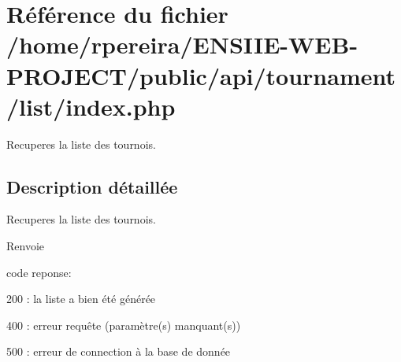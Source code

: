 \hypertarget{tournament_2list_2index_8php}{}\section{Référence du fichier /home/rpereira/\+E\+N\+S\+I\+I\+E-\/\+W\+E\+B-\/\+P\+R\+O\+J\+E\+C\+T/public/api/tournament/list/index.php}
\label{tournament_2list_2index_8php}


Recuperes la liste des tournois.  




\subsection{Description détaillée}
Recuperes la liste des tournois. 

\begin{DoxyReturn}{Renvoie}

\begin{DoxyItemize}
\item code reponse\+:
\begin{DoxyItemize}
\item 200 \+: la liste a bien été générée
\item 400 \+: erreur requête (paramètre(s) manquant(s))
\item 500 \+: erreur de connection à la base de donnée 
\end{DoxyItemize}
\end{DoxyItemize}
\end{DoxyReturn}
